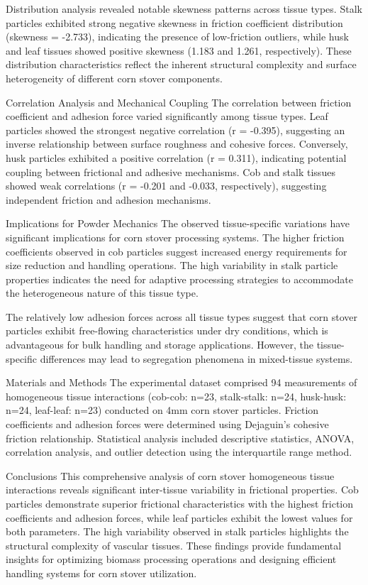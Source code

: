 \documentclass[xcolor=dvipsnames,10pt,hidelinks]{article}
\begin{document}
Distribution analysis revealed notable skewness patterns across tissue types. Stalk particles exhibited strong negative skewness in friction coefficient distribution (skewness = -2.733), indicating the presence of low-friction outliers, while husk and leaf tissues showed positive skewness (1.183 and 1.261, respectively). These distribution characteristics reflect the inherent structural complexity and surface heterogeneity of different corn stover components.

Correlation Analysis and Mechanical Coupling
The correlation between friction coefficient and adhesion force varied significantly among tissue types. Leaf particles showed the strongest negative correlation (r = -0.395), suggesting an inverse relationship between surface roughness and cohesive forces. Conversely, husk particles exhibited a positive correlation (r = 0.311), indicating potential coupling between frictional and adhesive mechanisms. Cob and stalk tissues showed weak correlations (r = -0.201 and -0.033, respectively), suggesting independent friction and adhesion mechanisms.

Implications for Powder Mechanics
The observed tissue-specific variations have significant implications for corn stover processing systems. The higher friction coefficients observed in cob particles suggest increased energy requirements for size reduction and handling operations. The high variability in stalk particle properties indicates the need for adaptive processing strategies to accommodate the heterogeneous nature of this tissue type.

The relatively low adhesion forces across all tissue types suggest that corn stover particles exhibit free-flowing characteristics under dry conditions, which is advantageous for bulk handling and storage applications. However, the tissue-specific differences may lead to segregation phenomena in mixed-tissue systems.

Materials and Methods
The experimental dataset comprised 94 measurements of homogeneous tissue interactions (cob-cob: n=23, stalk-stalk: n=24, husk-husk: n=24, leaf-leaf: n=23) conducted on 4mm corn stover particles. Friction coefficients and adhesion forces were determined using Dejaguin's cohesive friction relationship. Statistical analysis included descriptive statistics, ANOVA, correlation analysis, and outlier detection using the interquartile range method.

Conclusions
This comprehensive analysis of corn stover homogeneous tissue interactions reveals significant inter-tissue variability in frictional properties. Cob particles demonstrate superior frictional characteristics with the highest friction coefficients and adhesion forces, while leaf particles exhibit the lowest values for both parameters. The high variability observed in stalk particles highlights the structural complexity of vascular tissues. These findings provide fundamental insights for optimizing biomass processing operations and designing efficient handling systems for corn stover utilization.
\end{document}
